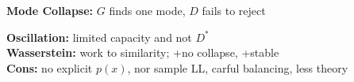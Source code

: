 \textbf{Mode Collapse:} $G$ finds one mode, $D$ fails to reject\\

\textbf{Oscillation:} limited capacity and not $D^*$\\

\textbf{Wasserstein:} work to similarity; +no collapse, +stable\\

\textbf{Cons:} no explicit $p(x)$, nor sample LL, carful balancing, less theory\\ 



